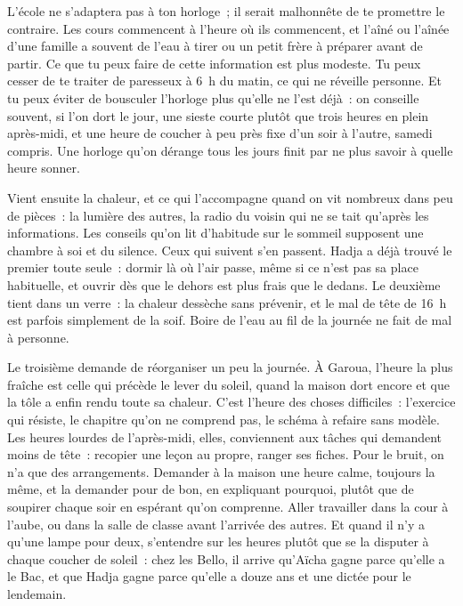 \documentclass[10.5pt,twoside,openright]{book}
\begin{document}
L’école ne s’adaptera pas à ton horloge ; il serait malhonnête de te promettre le contraire. Les cours commencent à l’heure où ils commencent, et l’aîné ou l’aînée d’une famille a souvent de l’eau à tirer ou un petit frère à préparer avant de partir. Ce que tu peux faire de cette information est plus modeste. Tu peux cesser de te traiter de paresseux à 6 h du matin, ce qui ne réveille personne. Et tu peux éviter de bousculer l’horloge plus qu’elle ne l’est déjà : on conseille souvent, si l’on dort le jour, une sieste courte plutôt que trois heures en plein après-midi, et une heure de coucher à peu près fixe d’un soir à l’autre, samedi compris. Une horloge qu’on dérange tous les jours finit par ne plus savoir à quelle heure sonner.

Vient ensuite la chaleur, et ce qui l’accompagne quand on vit nombreux dans peu de pièces : la lumière des autres, la radio du voisin qui ne se tait qu’après les informations. Les conseils qu’on lit d’habitude sur le sommeil supposent une chambre à soi et du silence. Ceux qui suivent s’en passent. Hadja a déjà trouvé le premier toute seule : dormir là où l’air passe, même si ce n’est pas sa place habituelle, et ouvrir dès que le dehors est plus frais que le dedans. Le deuxième tient dans un verre : la chaleur dessèche sans prévenir, et le mal de tête de 16 h est parfois simplement de la soif. Boire de l’eau au fil de la journée ne fait de mal à personne.

Le troisième demande de réorganiser un peu la journée. À Garoua, l’heure la plus fraîche est celle qui précède le lever du soleil, quand la maison dort encore et que la tôle a enfin rendu toute sa chaleur. C’est l’heure des choses difficiles : l’exercice qui résiste, le chapitre qu’on ne comprend pas, le schéma à refaire sans modèle. Les heures lourdes de l’après-midi, elles, conviennent aux tâches qui demandent moins de tête : recopier une leçon au propre, ranger ses fiches. Pour le bruit, on n’a que des arrangements. Demander à la maison une heure calme, toujours la même, et la demander pour de bon, en expliquant pourquoi, plutôt que de soupirer chaque soir en espérant qu’on comprenne. Aller travailler dans la cour à l’aube, ou dans la salle de classe avant l’arrivée des autres. Et quand il n’y a qu’une lampe pour deux, s’entendre sur les heures plutôt que se la disputer à chaque coucher de soleil : chez les Bello, il arrive qu’Aïcha gagne parce qu’elle a le Bac, et que Hadja gagne parce qu’elle a douze ans et une dictée pour le lendemain.
\end{document}
